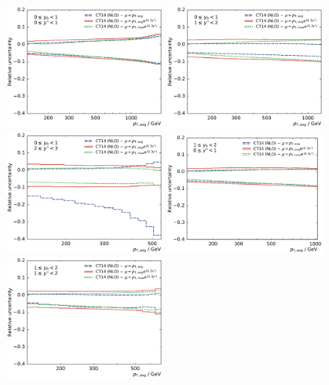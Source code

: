 \begin{figure}[htp]
    \centering
    \includegraphics[width=0.47\textwidth]{figures/theory/scale_uncert_comp_yb0ys0.pdf}\hfill
    \includegraphics[width=0.47\textwidth]{figures/theory/scale_uncert_comp_yb0ys1.pdf}
    \includegraphics[width=0.47\textwidth]{figures/theory/scale_uncert_comp_yb0ys2.pdf}\hfill
    \includegraphics[width=0.47\textwidth]{figures/theory/scale_uncert_comp_yb1ys0.pdf}
    \includegraphics[width=0.47\textwidth]{figures/theory/scale_uncert_comp_yb1ys1.pdf}\hfill

\end{figure}
